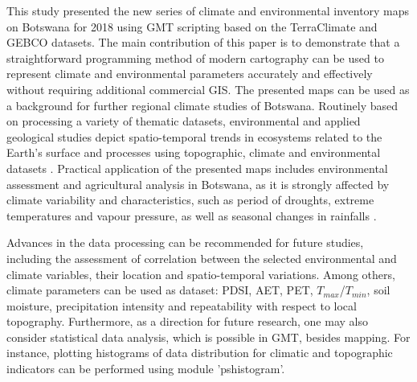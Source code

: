 \documentclass[ijgi,article,submit,pdftex,moreauthors]{Definitions/mdpi}
\begin{document}
This study presented the new series of climate and environmental inventory maps on Botswana for 2018 using GMT scripting based on the TerraClimate and GEBCO datasets. The main contribution of this paper is to demonstrate that a straightforward programming method of modern cartography can be used to represent climate and environmental parameters accurately and effectively without requiring additional commercial GIS. The presented maps can be used as a background for further regional climate studies of Botswana. Routinely based on processing a variety of thematic datasets, environmental and applied geological studies depict spatio-temporal trends in ecosystems related to the Earth’s surface and processes using topographic, climate and environmental datasets  \cite{AkinyemiKgomo,Ishimoto,Klauco2013,Eze,Lemenkova202212,Chipanshi,Klauco2017}. Practical application of the presented maps includes environmental assessment and agricultural analysis in Botswana, as it is strongly affected by climate variability and characteristics, such as period of droughts, extreme temperatures and vapour pressure, as well as seasonal changes in rainfalls \cite{Maruatona,PARIDA2008614,MOSES2018102,DAHLBERG200019}.

Advances in the data processing can be recommended for future studies, including the assessment of correlation between the selected environmental and climate variables, their location and spatio-temporal variations. Among others, climate parameters can be used as dataset: PDSI, AET, PET, $T_{max}$/$T_{min}$, soil moisture, precipitation intensity and repeatability with respect to local topography. Furthermore, as a direction for future research, one may also consider statistical data analysis, which is possible in GMT, besides mapping. For instance, plotting histograms of data distribution for climatic and topographic indicators can be performed using module 'pshistogram'.

\vspace{6pt} 




\end{document}
